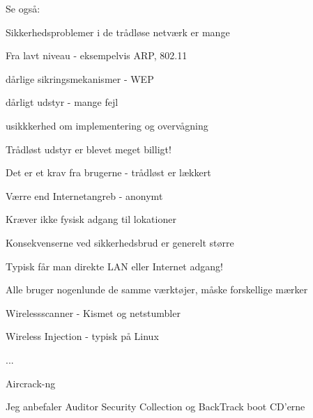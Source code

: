 \documentclass[Screen16to9,17pt]{foils}
\begin{document}

\begin{list1}
\item Se også:
\end{list1}



\begin{list1}
\item Sikkerhedsproblemer i de trådløse netværk er mange
  \begin{list2}
  \item Fra lavt niveau - eksempelvis ARP, 802.11
  \item dårlige sikringsmekanismer - WEP
  \item dårligt udstyr - mange fejl
  \item usikkkerhed om implementering og overvågning
  \end{list2}
\item Trådløst udstyr er blevet meget billigt!
\item Det er et krav fra brugerne - trådløst er lækkert
\end{list1}




\begin{list2}
\item Værre end Internetangreb - anonymt
\item Kræver ikke fysisk adgang til lokationer
\item Konsekvenserne ved sikkerhedsbrud er generelt større
\item Typisk får man direkte LAN eller Internet adgang!
\end{list2}


\begin{list1}
\item Alle bruger nogenlunde de samme værktøjer, måske forskellige
  mærker
\begin{list2}
\item Wirelessscanner - Kismet og netstumbler
\item Wireless Injection - typisk på Linux
\item ...
\item Aircrack-ng
\end{list2}
\item Jeg anbefaler Auditor Security Collection og BackTrack boot CD'erne
\end{list1}
\end{document}
